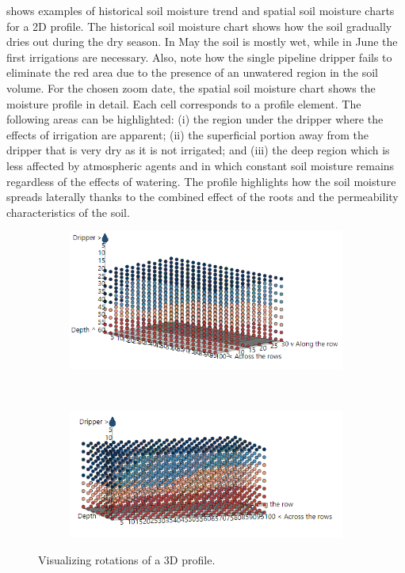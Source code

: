  shows examples of historical soil moisture trend and spatial soil moisture charts for a 2D profile.
The historical soil moisture chart shows how the soil gradually dries out during the dry season.
In May the soil is mostly wet, while in June the first irrigations are necessary. 
Also, note how the single pipeline dripper fails to eliminate the red area due to the presence of an unwatered region in the soil volume.
For the chosen zoom date, the spatial soil moisture chart shows the moisture profile in detail. Each cell corresponds to a profile element.
The following areas can be highlighted: (i) the region under the dripper where the effects of irrigation are apparent; (ii) the superficial portion away from the dripper that is very dry as it is not irrigated; and (iii) the deep region which is less affected by atmospheric agents and in which constant soil moisture remains regardless of the effects of watering.
The profile highlights how the soil moisture spreads laterally thanks to the combined effect of the roots and the permeability characteristics of the soil.

\begin{figure}[t]
\centering
\begin{subfigure}[t]{.45\textwidth}
\centering
\includegraphics[scale=.4]{chapters/physics-aware/pluto/img/3d-visualization-a.png}
\end{subfigure}
~
\begin{subfigure}[t]{.45\textwidth}
\centering
\includegraphics[scale=.45]{chapters/physics-aware/pluto/img/3d-visualization-b.png}
\end{subfigure}
\caption{Visualizing rotations of a 3D profile.}
\label{pluto-fig:3D-visualization}
\end{figure}

